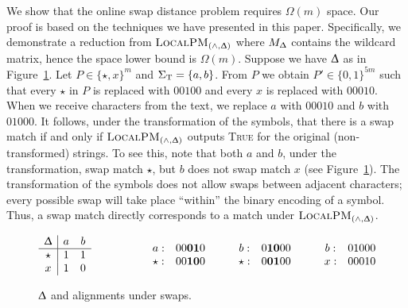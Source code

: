 \documentclass{article}
\renewcommand{\Delta}{\Updelta}
\newcommand{\TRUE}{\textsc{True}\xspace}
\newcommand{\SigmaT}{\ensuremath{\Sigma_{\textup{T}}}}
\newcommand{\local}{\ensuremath{\textsc{LocalPM}}}
\newcommand{\wildcard}{\ensuremath{\star}}
\theoremstyle{plain}
\theoremstyle{definition}
\begin{document}
We show that the online swap distance problem requires $\Omega(m)$ space. Our proof is based on the techniques we have presented in this paper.  Specifically, we demonstrate a reduction from $\local_{(\wedge,\Delta)}$ where $M_\Delta$ contains the wildcard matrix, hence the space lower bound is $\Omega(m)$. Suppose we have $\Delta$ as in Figure~\ref{fig:swap}. Let $P\in\{\wildcard,x\}^m$ and $\SigmaT=\{a,b\}$. From $P$ we obtain $P'\in\{0,1\}^{5m}$ such that every $\wildcard$ in $P$ is replaced with $00100$ and every $x$ is replaced with $00010$. When we receive characters from the text, we replace $a$ with $00010$ and $b$ with $01000$. It follows, under the transformation of the symbols, that there is a swap match if and only if $\local_{(\wedge,\Delta)}$ outputs \TRUE for the original (non-transformed) strings. To see this, note that both $a$ and $b$, under the transformation, swap match $\wildcard$, but $b$ does not swap match $x$ (see Figure~\ref{fig:swap}). The transformation of the symbols does not allow swaps between adjacent characters; every possible swap will take place ``within'' the binary encoding of a symbol. Thus, a swap match directly corresponds to a match under $\local_{(\wedge,\Delta)}$.
\begin{figure}[t]
    \begin{equation*}
        \begin{array}{c|cc}
             \Delta & a & b\\
             \hline \wildcard & 1 & 1\\
             x & 1 & 0
        \end{array}
        \qquad\qquad\quad
        \begin{array}{cc}
            a: & 00{\bf 01}0\\
            \wildcard: & 00{\bf 10}0
        \end{array}
        \qquad
        \begin{array}{cc}
            b: & 0{\bf 10}00\\
            \wildcard: & 0{\bf 01}00
        \end{array}
        \qquad
        \begin{array}{cc}
            b: & 01000\\
            x: & 00010
        \end{array}
    \end{equation*}
    \caption{\label{fig:swap}$\Delta$ and alignments under swaps.}
\end{figure}
\end{document}
